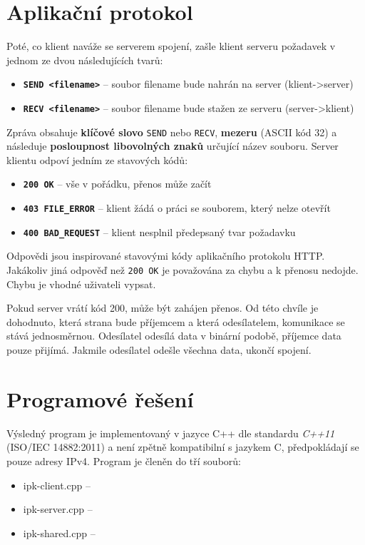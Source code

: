 \documentclass[11pt,a4paper]{article}
\begin{document}
\section{Aplikační protokol}
Poté, co klient naváže se serverem spojení, zašle klient serveru požadavek v jednom ze dvou následujících tvarů:
\begin{itemize}
	\item \texttt{\textbf{SEND <filename>}} -- soubor filename bude nahrán na server (klient->server)
	\item \texttt{\textbf{RECV <filename>}} -- soubor filename bude stažen ze serveru (server->klient)
\end{itemize}
Zpráva obsahuje \textbf{klíčové slovo} \texttt{SEND} nebo \texttt{RECV}, \textbf{mezeru} (ASCII kód 32) a následuje \textbf{posloupnost libovolných znaků} určující název souboru. Server klientu odpoví jedním ze stavových kódů:
\begin{itemize}
	\item \texttt{\textbf{200 OK}} -- vše v pořádku, přenos může začít
	\item \texttt{\textbf{403 FILE\_ERROR}} -- klient žádá o práci se souborem, který nelze otevřít
	\item \texttt{\textbf{400 BAD\_REQUEST}} -- klient nesplnil předepsaný tvar požadavku
\end{itemize}
Odpovědi jsou inspirované stavovými kódy aplikačního protokolu HTTP. Jakákoliv jiná odpověď než \texttt{200 OK} je považována za chybu a k přenosu nedojde. Chybu je vhodné uživateli vypsat.

Pokud server vrátí kód 200, může být zahájen přenos. Od této chvíle je dohodnuto, která strana bude příjemcem a která odesílatelem, komunikace se stává jednosměrnou. Odesílatel odesílá data v binární podobě, příjemce data pouze přijímá. Jakmile odesílatel odešle všechna data, ukončí spojení.

\section{Programové řešení}
Výsledný program je implementovaný v jazyce C++ dle standardu \textit{C++11} (ISO/IEC 14882:2011) a není zpětně kompatibilní s jazykem C, předpokládají se pouze adresy IPv4.
Program je členěn do tří souborů:
\begin{itemize}
\item ipk-client.cpp --
\item ipk-server.cpp --
\item ipk-shared.cpp --
\end{itemize}
\end{document}
